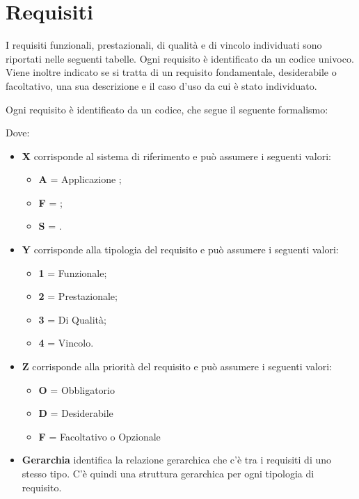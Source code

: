 \section{Requisiti }
I requisiti funzionali, prestazionali, di qualità e di vincolo individuati sono riportati nelle seguenti tabelle. Ogni requisito è identificato da un codice univoco.
Viene inoltre indicato se si tratta di un requisito fondamentale, desiderabile o facoltativo, una sua descrizione e il caso d'uso da cui è stato individuato. 

Ogni requisito è identificato da un codice, che segue il seguente formalismo:
\begin{center}
\end{center}

Dove:
\begin{itemize}
 \item \textbf{X} corrisponde al sistema di riferimento e può assumere i seguenti valori:
		\begin{itemize}
		 \item[] \textbf{A} = Applicazione ;
		 \item[] \textbf{F} = ;
		 \item[] \textbf{S} = .
		\end{itemize}

 \item \textbf{Y} corrisponde alla tipologia del requisito e può assumere i seguenti valori:
		\begin{itemize}
		 \item[] \textbf{1} = Funzionale;
		 \item[] \textbf{2} = Prestazionale;
		 \item[] \textbf{3} = Di Qualità;
		 \item[] \textbf{4} = Vincolo.
		\end{itemize}

 \item \textbf{Z} corrisponde alla priorità del requisito e può assumere i seguenti valori:
		\begin{itemize}
		 \item[] \textbf{O} = Obbligatorio
		 \item[] \textbf{D} = Desiderabile
		 \item[] \textbf{F} = Facoltativo o Opzionale
		\end{itemize}

 \item \textbf{Gerarchia} identifica la relazione gerarchica che c'è tra i requisiti di uno stesso tipo. C'è quindi una struttura gerarchica per ogni tipologia di requisito.
\end{itemize}

